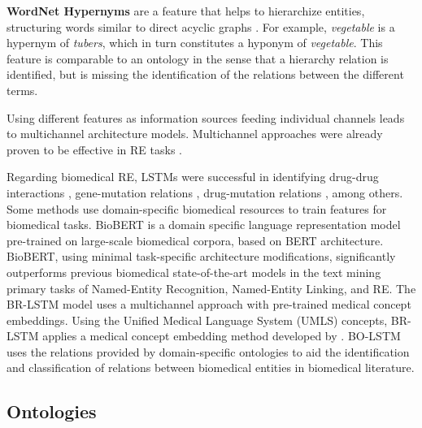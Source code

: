 \textbf{WordNet Hypernyms} are a feature that helps to hierarchize entities, structuring words similar to direct acyclic graphs \citep{WORDNET}. For example, \textit{vegetable} is a hypernym of \textit{tubers}, which in turn constitutes a hyponym of \textit{vegetable}. This feature is comparable to an ontology in the sense that a hierarchy relation is identified, but is missing the identification of the relations between the different terms. 

Using different features as information sources feeding individual channels leads to multichannel architecture models. Multichannel approaches were already proven to be effective in RE tasks \citep{xu-etal-2015-classifying}. 

Regarding biomedical RE, LSTMs were successful in identifying drug-drug interactions \citep{Wang2017}, gene-mutation relations \citep{song-etal-2018-n}, drug-mutation relations \citep{peng-etal-2017-cross}, among others. Some methods use domain-specific biomedical resources to train features for biomedical tasks. BioBERT \citep{BIOBERT} is a domain specific language representation model pre-trained on large-scale biomedical corpora, based on BERT \citep{BERT} architecture. BioBERT, using minimal task-specific architecture modifications, significantly outperforms previous biomedical state-of-the-art models in the text mining primary tasks of Named-Entity Recognition, Named-Entity Linking, and RE. The BR-LSTM \citep{Xu2018LeveragingBR} model uses a multichannel approach with pre-trained medical concept embeddings. Using the Unified Medical Language System (UMLS) concepts, BR-LSTM applies a medical concept embedding method developed by \cite{DeVine:2014:MSS:2661829.2661974}. BO-LSTM \citep{BOLSTM} uses the relations provided by domain-specific ontologies to aid the identification and classification of relations between biomedical entities in biomedical literature. 


\subsection{Ontologies}

